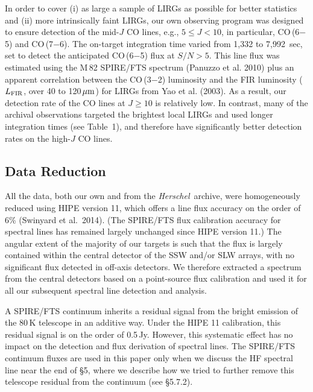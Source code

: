 \documentclass[preprint]{aastex}
\newcommand{\um}{\mbox{$\,\mu{\rm m}$}}
\newcommand{\etal}{et al.~}
\newcommand{\Herschel}{{\it Herschel}}
\newcommand{\LFIR}{\mbox{$L_{\rm FIR}$}}
\begin{document}
In order to cover (i) as large a sample of LIRGs as possible for better statistics 
and (ii) more intrinsically faint LIRGs,  our own observing program was designed 
to ensure detection of the mid-$J$ CO lines, e.g., $5 \leqslant J < 10$, in particular, 
CO\,(6$-$5) and CO\,(7$-$6).  The on-target integration time varied from 1,332 to 
7,992~sec, set to detect the anticipated CO\,(6$-$5) flux at $S/N > 5$. 
This line flux was estimated using the M\,82 SPIRE/FTS spectrum (Panuzzo et al. 2010)
plus an apparent correlation between the CO\,(3$-$2) luminosity and the FIR luminosity 
(\LFIR, over 40 to 120\um) for LIRGs from Yao et al. (2003).  As a result, 
our detection rate of the CO lines at $J \geqslant 10$ is relatively low.  In contrast,
many of the archival observations targeted the brightest local LIRGs and used longer
integration times (see Table~1), and therefore have significantly better detection 
rates on the high-$J$ CO lines.



\subsection{Data Reduction} \label{sec3.2}

All the data, both our own and from the \Herschel\ archive, were homogeneously 
reduced using HIPE version 11, which offers a line flux accuracy on the order of 
6\% (Swinyard \etal 2014). (The SPIRE/FTS flux calibration accuracy for spectral
lines has remained largely unchanged since HIPE version 11.) 
The angular extent of the majority of our targets is such that the flux is largely
contained within the central detector of the SSW and/or SLW arrays, with no 
significant flux detected in off-axis detectors.   We therefore
extracted a spectrum from the central detectors based on a point-source flux 
calibration and used it for all our subsequent spectral line detection and analysis.  


A SPIRE/FTS continuum inherits a residual signal from the bright emission of 
the 80\,K telescope in an additive way.  Under the HIPE 11 calibration,
this residual signal is on the order of 0.5\,Jy.  However, this systematic 
effect has no impact on the detection and flux derivation of spectral lines.  
The SPIRE/FTS continuum fluxes are used in this paper only when we discuss 
the HF spectral line near the end of \S5, where we describe how we tried to 
further remove this telescope residual from the continuum (see \S5.7.2).
\end{document}
